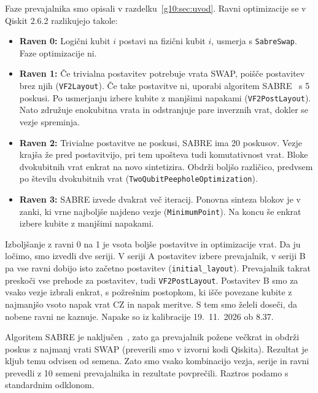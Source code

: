 Faze prevajalnika smo opisali v razdelku~\ref{g10:sec:uvod}.
Ravni optimizacije se v Qiskit 2.6.2 razlikujejo takole:

\begin{itemize}
\item \textbf{Raven 0:}
Logični kubit $i$ postavi na fizični kubit $i$,
usmerja s \texttt{SabreSwap}.
Faze optimizacije ni.
\item \textbf{Raven 1:}
Če trivialna postavitev potrebuje vrata SWAP,
poišče postavitev brez njih (\texttt{VF2Layout}).
Če take postavitve ni, 
uporabi algoritem SABRE~\cite{g10:li2019sabre} s 5 poskusi.
Po usmerjanju izbere kubite z manjšimi napakami
(\texttt{VF2PostLayout}).
Nato združuje enokubitna vrata in odstranjuje pare inverznih vrat,
dokler se vezje spreminja.
\item \textbf{Raven 2:}
Trivialne postavitve ne poskusi, SABRE ima 20 poskusov.
Vezje krajša že pred postavitvijo,
pri tem upošteva tudi komutativnost vrat.
Bloke dvokubitnih vrat enkrat na novo sintetizira.
Obdrži boljšo različico, predvsem po številu dvokubitnih vrat
(\texttt{TwoQubit\allowbreak Peephole\allowbreak Optimization}).
\item \textbf{Raven 3:}
SABRE izvede dvakrat več iteracij.
Ponovna sinteza blokov je v zanki,
ki vrne najboljše najdeno vezje (\texttt{MinimumPoint}).
Na koncu še enkrat izbere kubite z manjšimi napakami.
\end{itemize}

Izboljšanje z ravni 0 na 1 je
vsota boljše postavitve in optimizacije vrat.
Da ju ločimo, smo izvedli dve seriji.
V seriji A postavitev izbere prevajalnik,
v seriji B pa vse ravni dobijo isto začetno postavitev
(\texttt{initial\_layout}).
Prevajalnik takrat preskoči vse prehode za postavitev,
tudi \texttt{VF2PostLayout}.
Postavitev B smo za vsako vezje izbrali enkrat,
s požrešnim postopkom, ki išče povezane kubite z najmanjšo vsoto
napak vrat CZ in napak meritve.
S tem smo želeli doseči, da nobene ravni ne kaznuje.
Napake so iz kalibracije 19.~11.~2026 ob 8.37.

Algoritem SABRE je naključen~\cite{g10:qiskit_transpiler_stages},
zato ga prevajalnik požene večkrat
in obdrži poskus z najmanj vrati SWAP
(preverili smo v izvorni kodi Qiskita).
Rezultat je kljub temu odvisen od semena.
Zato smo vsako kombinacijo vezja, serije in ravni
prevedli z 10 semeni prevajalnika
in rezultate povprečili.
Raztros podamo s standardnim odklonom.

